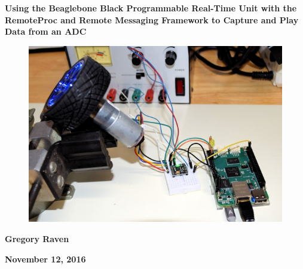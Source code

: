 \thispagestyle{empty}
{\centering\bfseries\color{black}\Huge
Using the Beaglebone Black Programmable Real-Time Unit with the RemoteProc and Remote Messaging Framework to Capture and Play Data from an ADC
\par}

\bigskip

\begin{figure}
	\centering
	\includegraphics[width=\textwidth]{photos/intro_view}
\end{figure}

\bigskip
{\centering\bfseries\Large
Gregory Raven
\par}


\bigskip
{\centering\bfseries\LARGE
November 12, 2016
\par}




